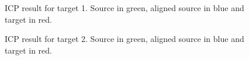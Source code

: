 \documentclass{article}
\theoremstyle{definition} %
\begin{document}
\begin{figure}[H]
    \centering
    \quad
    \caption{ICP result for target 1. Source in green, aligned source in blue and target in red.}
    \label{fig:icp_tgt_1}
\end{figure}

\begin{figure}[H]
    \centering
    \quad
    \caption{ICP result for target 2. Source in green, aligned source in blue and target in red.}
    \label{fig:icp_tgt_2}
\end{figure}
\end{document}
